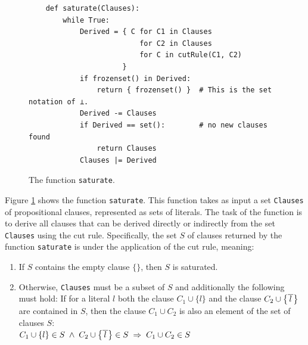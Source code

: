 \begin{figure}[!ht]
\centering
\begin{verbatim}
    def saturate(Clauses):
        while True:
            Derived = { C for C1 in Clauses
                          for C2 in Clauses
                          for C in cutRule(C1, C2)
                      }
            if frozenset() in Derived:
                return { frozenset() }  # This is the set notation of ⊥.
            Derived -= Clauses
            if Derived == set():        # no new clauses found
                return Clauses
            Clauses |= Derived
\end{verbatim}
\vspace*{-0.3cm}
\caption{The function \texttt{saturate}.}
\label{fig:Completeness.ipynb-2}
\end{figure}
Figure \ref{fig:Completeness.ipynb-2} shows the function \texttt{saturate}. This function takes
as input a set \texttt{Clauses} of propositional clauses, represented as sets of literals.
The task of the function is to derive all clauses that can be derived directly or indirectly from the set \texttt{Clauses}
using the cut rule. Specifically, the set $S$ of clauses returned by the function \texttt{saturate}
is  under the application of the cut rule, meaning:

\begin{enumerate}
\item If $S$ contains the empty clause $\{\}$, then $S$ is saturated.
\item Otherwise, \texttt{Clauses} must be a subset of $S$ and additionally the following must hold:
      If for a literal $l$ both the clause $C_1 \cup \{ l \}$ and the clause $C_2 \cup
      \bigl\{ \overline{\,l\,} \bigr\}$ are contained in $S$,
      then the clause $C_1 \cup C_2$ is also an element of the set of clauses $S$:
      \\[0.2cm]
      \hspace*{1.3cm}
      $C_1 \cup \{ l \} \in S \;\wedge\; C_2 \cup \bigl\{ \overline{\,l\,} \bigr\} \in S \;\Rightarrow\; C_1 \cup C_2 \in S$
\end{enumerate}


